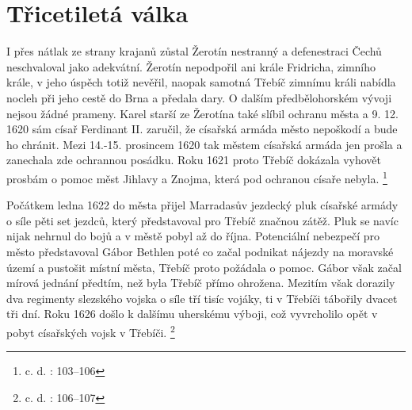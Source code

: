 \documentclass[a4paper,oneside,12p]{report}
\begin{document}

\section{Třicetiletá válka}

I přes nátlak ze strany krajanů zůstal Žerotín nestranný a defenestraci Čechů neschvaloval jako adekvátní.
Žerotín nepodpořil ani krále Fridricha, zimního krále, v jeho úspěch totiž nevěřil, naopak samotná Třebíč zimnímu králi nabídla nocleh při jeho cestě do Brna a předala dary.
O dalším předbělohorském vývoji nejsou žádné prameny.
Karel starší ze Žerotína také slíbil ochranu města a 9. 12. 1620 sám císař Ferdinant II. zaručil, že císařská armáda město nepoškodí a bude ho chránit.
Mezi 14.-15. prosincem 1620 tak městem císařská armáda jen prošla a zanechala zde ochrannou posádku.
Roku 1621 proto Třebíč dokázala vyhovět prosbám o pomoc měst Jihlavy a Znojma, která pod ochranou císaře nebyla. \footnote{c. d. : 103--106}

Počátkem ledna 1622 do města přijel Marradasův jezdecký pluk císařské armády o síle pěti set jezdců, který představoval pro Třebíč značnou zátěž.
Pluk se navíc nijak nehrnul do bojů a v městě pobyl až do října.
Potenciální nebezpečí pro město představoval Gábor Bethlen poté co začal podnikat nájezdy na moravské území a pustošit místní města, Třebíč proto požádala o pomoc.
Gábor však začal mírová jednání předtím, než byla Třebíč přímo ohrožena.
Mezitím však dorazily dva regimenty slezského vojska o síle tří tisíc vojáky, ti v Třebíči tábořily dvacet tři dní.
Roku 1626 došlo k dalšímu uherskému výboji, což vyvrcholilo opět v pobyt císařských vojsk v Třebíči. \footnote{c. d. : 106--107}
\end{document}
